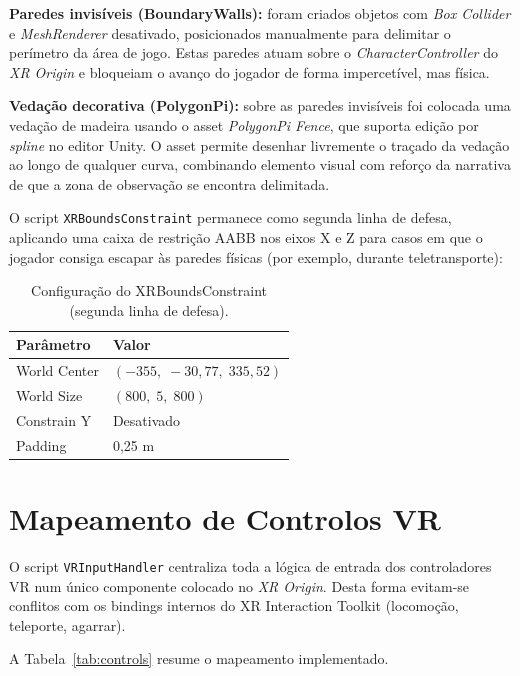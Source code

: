 \documentclass[a4paper,11pt]{report}
\newcommand{\code}[1]{\texttt{#1}}
\begin{document}
\textbf{Paredes invisíveis (BoundaryWalls):} foram criados objetos com
\textit{Box Collider} e \textit{MeshRenderer} desativado, posicionados
manualmente para delimitar o perímetro da área de jogo. Estas paredes
atuam sobre o \textit{CharacterController} do \textit{XR Origin} e bloqueiam
o avanço do jogador de forma impercetível, mas física.

\textbf{Vedação decorativa (PolygonPi):} sobre as paredes invisíveis foi
colocada uma vedação de madeira usando o asset \textit{PolygonPi Fence},
que suporta edição por \textit{spline} no editor Unity. O asset permite
desenhar livremente o traçado da vedação ao longo de qualquer curva,
combinando elemento visual com reforço da narrativa de que a zona de
observação se encontra delimitada.

O script \code{XRBoundsConstraint} permanece como segunda linha de defesa,
aplicando uma caixa de restrição AABB nos eixos X e Z para casos em que o
jogador consiga escapar às paredes físicas (por exemplo, durante teletransporte):

\begin{table}[H]
\centering
\begin{tabular}{ll}
\toprule
\textbf{Parâmetro} & \textbf{Valor} \\
\midrule
World Center & $(-355,\; -30{,}77,\; 335{,}52)$ \\
World Size   & $(800,\; 5,\; 800)$ \\
Constrain Y  & Desativado \\
Padding      & 0,25 m \\
\bottomrule
\end{tabular}
\caption{Configuração do XRBoundsConstraint (segunda linha de defesa).}
\label{tab:bounds}
\end{table}

\section{Mapeamento de Controlos VR}

O script \code{VRInputHandler} centraliza toda a lógica de entrada dos
controladores VR num único componente colocado no \textit{XR Origin}. Desta
forma evitam-se conflitos com os bindings internos do XR Interaction Toolkit
(locomoção, teleporte, agarrar).

A Tabela~\ref{tab:controls} resume o mapeamento implementado.
\end{document}
